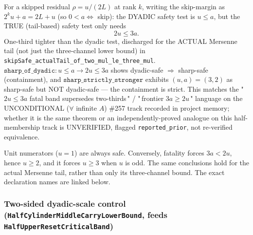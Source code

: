 \begin{thm}
For a skipped residual $\rho=u/(2L)$ at rank $k$, writing the skip-margin as
$2^k u + a = 2L+u$ (so $0<a\Leftrightarrow$ skip): the DYADIC safety test is $u\le a$, but the
TRUE (tail-based) safety test only needs
\[
2u \le 3a.
\]
One-third tighter than the dyadic test, discharged for the ACTUAL Mersenne tail (not just the
three-channel lower bound) in \texttt{skipSafe\_actualTail\_of\_two\_mul\_le\_three\_mul}.
$\mathtt{sharp\_of\_dyadic}: u\le a\to2u\le3a$ shows dyadic-safe $\Rightarrow$ sharp-safe
(containment), and $\mathtt{sharp\_strictly\_stronger}$ exhibits $(u,a)=(3,2)$ as sharp-safe but
NOT dyadic-safe — the containment is strict. This matches the "\,$2u\le3a$ fatal band
supersedes two-thirds\," / "\,frontier $3a\ge2u$\," language on the UNCONDITIONAL ($\forall$
infinite $A$) \#257 track recorded in project memory; whether it is the same theorem or an
independently-proved analogue on this half-membership track is UNVERIFIED, flagged
\texttt{reported\_prior}, not re-verified equivalence.
\par\noindent{}      
\end{thm}

\begin{prop}
Unit numerators ($u=1$) are always safe. Conversely, fatality forces $3a<2u$, hence
$u\ge2$, and it forces $u\ge3$ when $u$ is odd. The same conclusions hold for the actual
Mersenne tail, rather than only its three-channel bound. The exact declaration names are linked
below.
\par\noindent{}      
\end{prop}

\subsubsection*{Two-sided dyadic-scale control (\texttt{HalfCylinderMiddleCarryLowerBound}, feeds \texttt{HalfUpperResetCriticalBand})}

